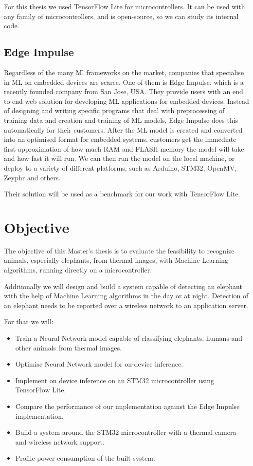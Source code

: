 For this thesis we used TensorFlow Lite for microcontrollers.
It can be used with any family of microcontrollers, and is open-source, so we can study its internal code.


\subsection{ Edge Impulse}

Regardless of the many Ml frameworks on the market, companies that specialise in ML on embedded devices are scarce.
One of them is Edge Impulse, which is a recently founded company from San Jose, USA.
They provide users with an end to end web solution for developing ML applications for embedded devices.
Instead of designing and writing specific programs that deal with preprocessing of training data and creation and training of ML models, Edge Impulse does this automatically for their customers.
After the ML model is created and converted into an optimised format for embedded systems, customers get the immediate first approximation of how much RAM and FLASH memory the model will take and how fast it will run.
We can then run the model on the local machine, or deploy to a variety of different platforms, such as Arduino, STM32, OpenMV, Zeyphr and others.

Their solution will be used as a benchmark for our work with TensorFlow Lite.


\section{ Objective}\label{objective}

The objective of this Master's thesis is to evaluate the feasibility to recognize animals, especially elephants, from thermal images, with Machine Learning algorithms, running directly on a microcontroller.

Additionally we will design and build a system capable of detecting an elephant with the help of Machine Learning algorithms in the day or at night.
Detection of an elephant needs to be reported over a wireless network to an application server.

For that we will:

\begin{itemize}
    \item Train a Neural Network model capable of classifying elephants, humans and other animals from thermal images.
    \item Optimise Neural Network model for on-device inference.
    \item Implement on device inference on an STM32 microcontroller using TensorFlow Lite.
    \item Compare the performance of our implementation against the Edge Impulse implementation.
    \item Build a system around the STM32 microcontroller with a thermal camera and wireless network support.
    \item Profile power consumption of the built system.
\end{itemize}


